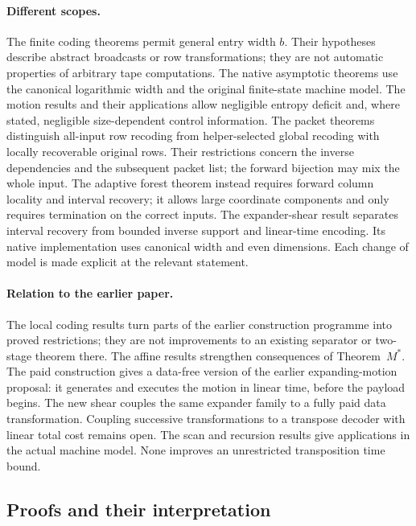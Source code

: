 \paragraph{Different scopes.}
The finite coding theorems permit general entry width $b$. Their hypotheses
describe abstract broadcasts or row transformations; they are not automatic
properties of arbitrary tape computations. The native asymptotic theorems use
the canonical logarithmic width and the original finite-state machine model.
The motion results and their applications allow negligible entropy deficit
and, where stated, negligible size-dependent control information. The packet
theorems distinguish all-input row recoding from helper-selected global
recoding with locally recoverable original rows. Their restrictions concern
the inverse dependencies and the subsequent packet list; the forward
bijection may mix the whole input. The adaptive forest theorem instead
requires forward column locality and interval recovery; it allows large
coordinate components and only requires termination on the correct inputs.
The expander-shear result separates interval recovery from bounded inverse
support and linear-time encoding. Its native implementation uses canonical
width and even dimensions. Each change of model is made explicit at
the relevant statement.

\paragraph{Relation to the earlier paper.}
The local coding results turn parts of the earlier construction programme into
proved restrictions; they are not improvements to an existing separator or
two-stage theorem there. The affine results strengthen consequences of
Theorem~$M^*$. The paid construction gives a data-free version of the earlier
expanding-motion proposal: it generates and executes the motion in linear
time, before the payload begins. The new shear couples the same expander
family to a fully paid data transformation. Coupling successive transformations
to a transpose decoder with linear total cost remains open.
The scan and recursion results give applications
in the actual machine model. None improves an unrestricted transposition time
bound.

\subsection{Proofs and their interpretation}\label{sec:proof-policy}


